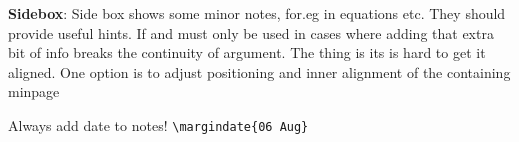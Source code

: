 \documentclass[12pt, a4paper]{article}
\begin{document}

\vspace*{1cm}

\begin{minipage}[t][][t]{.6\textwidth}%
	\textbf{Sidebox}: Side box shows some minor notes, for.eg in equations etc. They should provide useful hints. If and must only be used in cases where adding that extra bit of info breaks the continuity of argument. The thing is its is hard to get it aligned. One option is to adjust positioning and inner alignment of the containing minpage
\end{minipage}%
\hfill%
\begin{minipage}[t][][b]{6cm}%
\end{minipage}

%
Always add date to notes! \verb|\margindate{06 Aug}|

\end{document}
